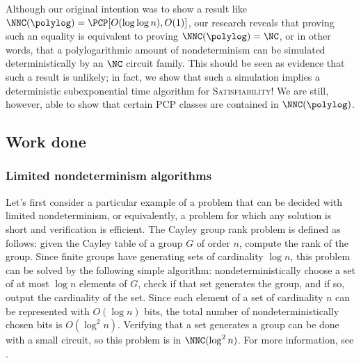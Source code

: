 \documentclass{article}
\begin{document}
Although our original intention was to show a result like $\NNC(\polylog) = \PCP[O(\log \log n), O(1)]$, our research reveals that proving such an equality is equivalent to proving $\NNC(\polylog) = \NC$, or in other words, that a polylogarithmic amount of nondeterminism can be simulated deterministically by an $\NC$ circuit family.
This should be seen as evidence that such a result is unlikely; in fact, we show that such a simulation implies a deterministic subexponential time algorithm for \textsc{Satisfiability}!
We are still, however, able to show that certain PCP classes are contained in $\NNC(\polylog)$.


\subsection{Work done}

\subsubsection{Limited nondeterminism algorithms}

Let's first consider a particular example of a problem that can be decided with limited nondeterminism, or equivalently, a problem for which any solution is short and verification is efficient.
The Cayley group rank problem is defined as follows: given the Cayley table of a group $G$ of order $n$, compute the rank of the group.
Since finite groups have generating sets of cardinality $\log n$, this problem can be solved by the following simple algorithm: nondeterministically choose a set of at most $\log n$ elements of $G$, check if that set generates the group, and if so, output the cardinality of the set.
Since each element of a set of cardinality $n$ can be represented with $O(\log n)$ bits, the total number of nondeterministically chosen bits is $O(\log^2 n)$.
Verifying that a set generates a group can be done with a small circuit, so this problem is in $\NNC(\log^2 n)$.
For more information, see \autocite{grouprank}.
\end{document}
